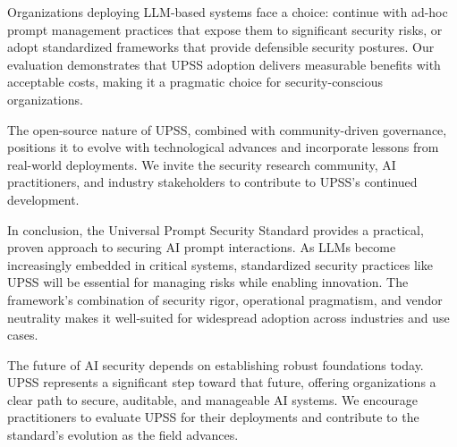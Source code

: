 Organizations deploying LLM-based systems face a choice: continue with ad-hoc prompt management practices that expose them to significant security risks, or adopt standardized frameworks that provide defensible security postures. Our evaluation demonstrates that UPSS adoption delivers measurable benefits with acceptable costs, making it a pragmatic choice for security-conscious organizations.

The open-source nature of UPSS, combined with community-driven governance, positions it to evolve with technological advances and incorporate lessons from real-world deployments. We invite the security research community, AI practitioners, and industry stakeholders to contribute to UPSS's continued development.

In conclusion, the Universal Prompt Security Standard provides a practical, proven approach to securing AI prompt interactions. As LLMs become increasingly embedded in critical systems, standardized security practices like UPSS will be essential for managing risks while enabling innovation. The framework's combination of security rigor, operational pragmatism, and vendor neutrality makes it well-suited for widespread adoption across industries and use cases.

The future of AI security depends on establishing robust foundations today. UPSS represents a significant step toward that future, offering organizations a clear path to secure, auditable, and manageable AI systems. We encourage practitioners to evaluate UPSS for their deployments and contribute to the standard's evolution as the field advances.
